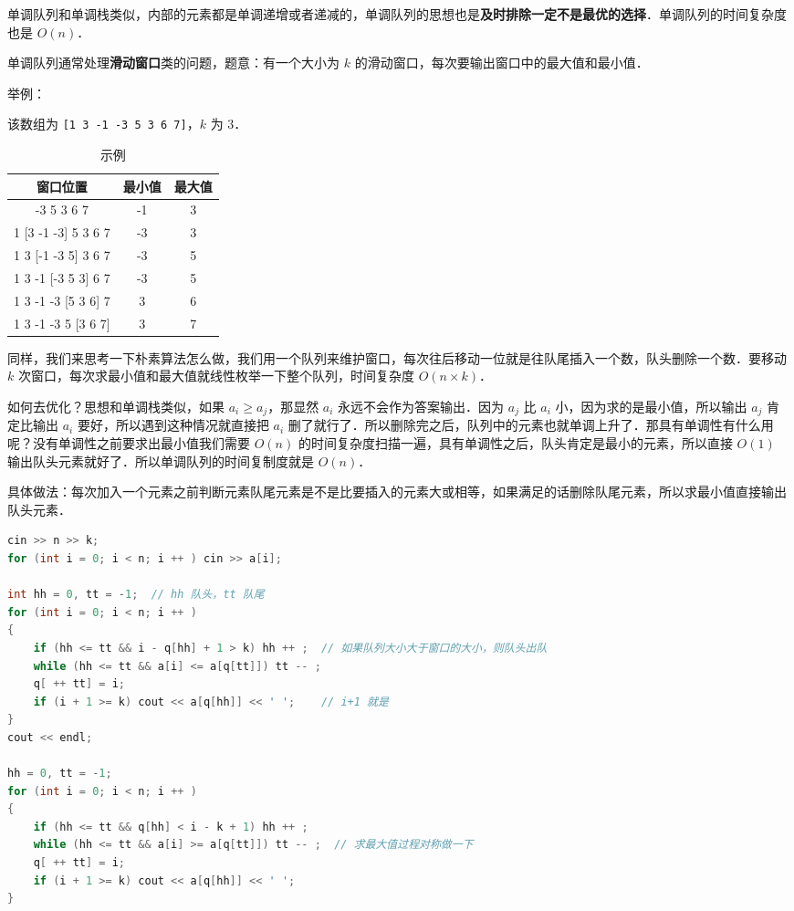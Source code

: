 
单调队列和单调栈类似，内部的元素都是单调递增或者递减的，单调队列的思想也是\textbf{及时排除一定不是最优的选择}．单调队列的时间复杂度也是 $O(n)$．

单调队列通常处理\textbf{滑动窗口}类的问题，题意：有一个大小为 $k$ 的滑动窗口，每次要输出窗口中的最大值和最小值．

举例：

该数组为 \verb|[1 3 -1 -3 5 3 6 7]|，$k$ 为 $3$．

\begin{table}[ht]
\centering
\caption{示例}\label{Mqueue_tab1}
\begin{tabular}{|c|c|c|}
\hline
窗口位置	 & 最小值	 & 最大值 \\
\hline
[1 3 -1] -3 5 3 6 7	 & -1 & 3 \\
\hline
1 [3 -1 -3] 5 3 6 7	 & -3 & 3 \\
\hline
1 3 [-1 -3 5] 3 6 7	 & -3 & 5 \\
\hline
1 3 -1 [-3 5 3] 6 7	 & -3 & 5 \\
\hline
1 3 -1 -3 [5 3 6] 7	 & 3 & 6 \\
\hline
1 3 -1 -3 5 [3 6 7]	 & 3 & 7 \\
\hline
\end{tabular}
\end{table}

同样，我们来思考一下朴素算法怎么做，我们用一个队列来维护窗口，每次往后移动一位就是往队尾插入一个数，队头删除一个数．要移动 $k$ 次窗口，每次求最小值和最大值就线性枚举一下整个队列，时间复杂度 $O(n\times k)$．

如何去优化？思想和单调栈类似，如果 $a_i \geqslant a_j$，那显然 $a_i$ 永远不会作为答案输出．因为 $a_j$ 比 $a_i$ 小，因为求的是最小值，所以输出 $a_j$ 肯定比输出 $a_i$ 要好，所以遇到这种情况就直接把 $a_i$ 删了就行了．所以删除完之后，队列中的元素也就单调上升了．那具有单调性有什么用呢？没有单调性之前要求出最小值我们需要 $O(n)$ 的时间复杂度扫描一遍，具有单调性之后，队头肯定是最小的元素，所以直接 $O(1)$ 输出队头元素就好了．所以单调队列的时间复制度就是 $O(n)$．

具体做法：每次加入一个元素之前判断元素队尾元素是不是比要插入的元素大或相等，如果满足的话删除队尾元素，所以求最小值直接输出队头元素．

\begin{lstlisting}[language=cpp]
cin >> n >> k;
for (int i = 0; i < n; i ++ ) cin >> a[i];

int hh = 0, tt = -1;  // hh 队头，tt 队尾
for (int i = 0; i < n; i ++ )
{
    if (hh <= tt && i - q[hh] + 1 > k) hh ++ ;  // 如果队列大小大于窗口的大小，则队头出队
    while (hh <= tt && a[i] <= a[q[tt]]) tt -- ;
    q[ ++ tt] = i;
    if (i + 1 >= k) cout << a[q[hh]] << ' ';    // i+1 就是
}
cout << endl;

hh = 0, tt = -1;
for (int i = 0; i < n; i ++ )
{
    if (hh <= tt && q[hh] < i - k + 1) hh ++ ;
    while (hh <= tt && a[i] >= a[q[tt]]) tt -- ;  // 求最大值过程对称做一下
    q[ ++ tt] = i;
    if (i + 1 >= k) cout << a[q[hh]] << ' ';
}
\end{lstlisting}